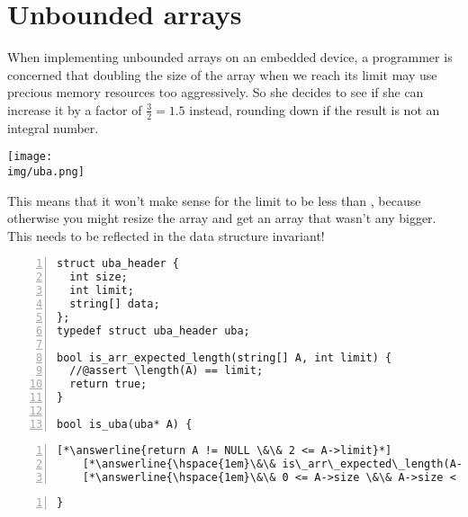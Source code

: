 \section*{Unbounded arrays%
}

When implementing unbounded arrays on an embedded device, a programmer
is concerned that doubling the size of the array when we reach its
limit may use precious memory resources too aggressively.  So she
decides to see if she can increase it by a factor of $\frac{3}{2} =
1.5$ instead, rounding down if the result is not an integral number.
\begin{center}
  \texttt{[image: \\img/uba.png]}
\end{center}
This means that it won't make sense for the limit to be less than
, because otherwise you
might resize the array and get an array that wasn't any bigger. This
needs to be reflected in the data structure invariant!

\begin{lstlisting}[numbers=left, name="uba_header", belowskip=0pt]
struct uba_header {
  int size;
  int limit;
  string[] data;
};
typedef struct uba_header uba;

bool is_arr_expected_length(string[] A, int limit) {
  //@assert \length(A) == limit;
  return true;
}

bool is_uba(uba* A) {
\end{lstlisting}
\begin{lstlisting}[numbers=left, name="uba_header", aboveskip=0pt, belowskip=0pt, lineskip=2ex]
    [*\answerline{return A != NULL \&\& 2 <= A->limit}*]
    [*\answerline{\hspace{1em}\&\& is\_arr\_expected\_length(A->data, A->limit)}*]
    [*\answerline{\hspace{1em}\&\& 0 <= A->size \&\& A->size < A->limit;}*]
  \end{lstlisting}
\begin{lstlisting}[numbers=left, name="uba_header", aboveskip=0pt]
}

\end{lstlisting}